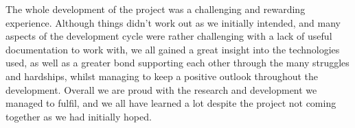\begin{flushleft}
The whole development of the project was a challenging and rewarding experience. Although things didn't work out as we initially intended, and many aspects of the development cycle were rather challenging with a lack of useful documentation to work with, we all gained a great insight into the technologies used, as well as a greater bond supporting each other through the many struggles and hardships, whilst managing to keep a positive outlook throughout the development. Overall we are proud with the research and development we managed to fulfil, and we all have learned a lot despite the project not coming together as we had initially hoped.
\end{flushleft}

\newpage
